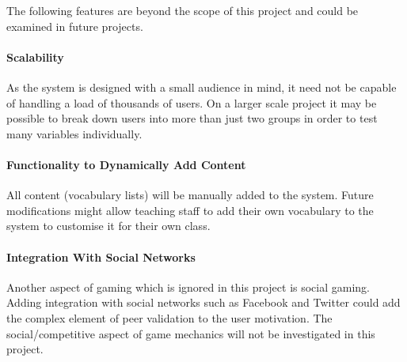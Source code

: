 The following features are beyond the scope of this project and could be examined
in future projects.

\paragraph{Scalability}
As the system is designed with a small audience in mind, it need not be capable
of handling a load of thousands of users. On a larger scale project it may be
possible to break down users into more than just two groups in order to test
many variables individually.

\paragraph{Functionality to Dynamically Add Content}
All content (vocabulary lists) will be manually added to the system. Future
modifications might allow teaching staff to add their own vocabulary to the
system to customise it for their own class.

\paragraph{Integration With Social Networks}
Another aspect of gaming which is ignored in this project is social gaming.
Adding integration with social networks such as Facebook and Twitter could add
the complex element of peer validation to the user motivation. The social/competitive
aspect of game mechanics will not be investigated in this project.
